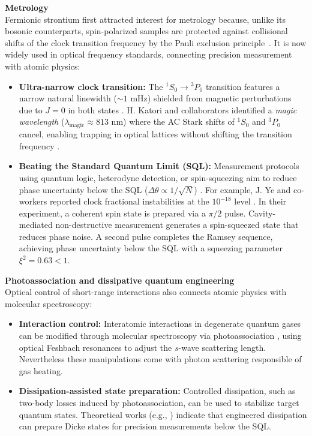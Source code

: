 \textbf{Metrology}\\
Fermionic strontium first attracted interest for metrology because, unlike its bosonic counterparts, spin-polarized samples are protected against collisional shifts of the clock transition frequency by the Pauli exclusion principle~\cite{Derevianko2011Clock}. It is now widely used in optical frequency standards, connecting precision measurement with atomic physics:
\begin{itemize}
\item \textbf{Ultra-narrow clock transition:} The $^1S_0 \rightarrow {}^3P_0$ transition features a narrow natural linewidth ($\sim 1\text{ mHz}$) shielded from magnetic perturbations due to $J=0$ in both states \cite{Derevianko2011Clock}. H. Katori and collaborators identified a \textit{magic wavelength} ($\lambda_{\text{magic}} \approx 813\text{ nm}$) where the AC Stark shifts of $^1S_0$ and $^3P_0$ cancel, enabling trapping in optical lattices without shifting the transition frequency \cite{Katori2003Ultrastable}.
\item \textbf{Beating the Standard Quantum Limit (SQL):} Measurement protocols using quantum logic, heterodyne detection, or spin-squeezing aim to reduce phase uncertainty below the SQL ($\Delta \theta \propto 1/\sqrt{N}$) \cite{pezze_quantum_2014}. For example, J. Ye and co-workers reported clock fractional instabilities at the $10^{-18}$ level \cite{Yang2025ClockPrecision}. In their experiment, a coherent spin state is prepared via a $\pi/2$ pulse. Cavity-mediated non-destructive measurement generates a spin-squeezed state that reduces phase noise. A second pulse completes the Ramsey sequence, achieving phase uncertainty below the SQL with a squeezing parameter $\xi^2 = 0.63 < 1$.
\end{itemize}
\vspace{0.5em}

\textbf{Photoassociation and dissipative quantum engineering}\\
Optical control of short-range interactions also connects atomic physics with molecular spectroscopy:
\begin{itemize}
\item \textbf{Interaction control:} Interatomic interactions in degenerate quantum gases can be modified through molecular spectroscopy via photoassociation \cite{martinez_de_escobar_two-photon_2008, stellmer_degenerate_2014}, using optical Feshbach resonances to adjust the $s$-wave scattering length. Nevertheless these manipulations come with photon scattering responsible of gas heating.
\item \textbf{Dissipation-assisted state preparation:} Controlled dissipation, such as two-body losses induced by photoassociation, can be used to stabilize target quantum states. Theoretical works (e.g., \cite{foss-feig_steady-state_2012}) indicate that engineered dissipation can prepare Dicke states for precision measurements below the SQL.
\end{itemize}

